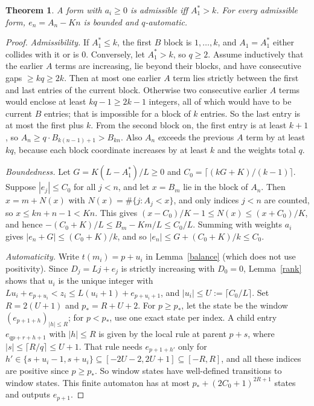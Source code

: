 \documentclass[11pt]{article}
\newtheorem{theorem}{Theorem}\newtheorem{lemma}[theorem]{Lemma}\newtheorem{proposition}[theorem]{Proposition}\newtheorem{corollary}[theorem]{Corollary}
\theoremstyle{remark}\newtheorem{remark}[theorem]{Remark}
\theoremstyle{definition}\newtheorem{definition}[theorem]{Definition}
\begin{document}
\begin{theorem}\label{zero}
A form with \(a_i\ge0\) is admissible iff \(A_1^*>k\). For every admissible form, \(e_n=A_n-Kn\) is bounded and \(q\)-automatic.
\end{theorem}
\begin{proof}
\emph{Admissibility.} If \(A_1^*\le k\), the first \(B\) block is \(1,\dots,k\), and \(A_1=A_1^*\) either collides with it or is \(0\). Conversely, let \(A_1^*>k\), so \(q\ge2\). Assume inductively that the earlier \(A\) terms are increasing, lie beyond their blocks, and have consecutive gaps \(\ge kq\ge2k\). Then at most one earlier \(A\) term lies strictly between the first and last entries of the current block. Otherwise two consecutive earlier \(A\) terms would enclose at least \(kq-1\ge2k-1\) integers, all of which would have to be current \(B\) entries; that is impossible for a block of \(k\) entries. So the last entry is at most the first plus \(k\). From the second block on, the first entry is at least \(k+1\), so \(A_n\ge q\cdot B_{k(n-1)+1}>B_{kn}\). Also \(A_n\) exceeds the previous \(A\) term by at least \(kq\), because each block coordinate increases by at least \(k\) and the weights total \(q\).

\emph{Boundedness.} Let \(G=K(L-A_1^*)/L\ge0\) and \(C_0=\lceil(kG+K)/(k-1)\rceil\). Suppose \(|e_j|\le C_0\) for all \(j<n\), and let \(x=B_m\) lie in the block of \(A_n\). Then \(x=m+N(x)\) with \(N(x)=\#\{j:A_j<x\}\), and only indices \(j<n\) are counted, so \(x\le kn+n-1<Kn\). This gives \((x-C_0)/K-1\le N(x)\le(x+C_0)/K\), and hence \(-(C_0+K)/L\le B_m-Km/L\le C_0/L\). Summing with weights \(a_i\) gives \(|e_n+G|\le(C_0+K)/k\), and so \(|e_n|\le G+(C_0+K)/k\le C_0\).

\emph{Automaticity.} Write \(t(m_i)=p+u_i\) in Lemma~\ref{balance} (which does not use positivity). Since \(D_j=Lj+e_j\) is strictly increasing with \(D_0=0\), Lemma~\ref{rank} shows that \(u_i\) is the unique integer with \(Lu_i+e_{p+u_i}<z_i\le L(u_i+1)+e_{p+u_i+1}\), and \(|u_i|\le U:=\lceil C_0/L\rceil\). Set \(R=2(U+1)\) and \(p_*=R+U+2\). For \(p\ge p_*\), let the state be the window \((e_{p+1+h})_{|h|\le R}\); for \(p<p_*\), use one exact state per index. A child entry \(e_{qp+r+h+1}\) with \(|h|\le R\) is given by the local rule at parent \(p+s\), where \(|s|\le\lceil R/q\rceil\le U+1\). That rule needs \(e_{p+1+h'}\) only for \(h'\in\{s+u_i-1,s+u_i\}\subseteq[-2U-2,2U+1]\subseteq[-R,R]\), and all these indices are positive since \(p\ge p_*\). So window states have well-defined transitions to window states. This finite automaton has at most \(p_*+(2C_0+1)^{2R+1}\) states and outputs \(e_{p+1}\).
\end{proof}
\end{document}
